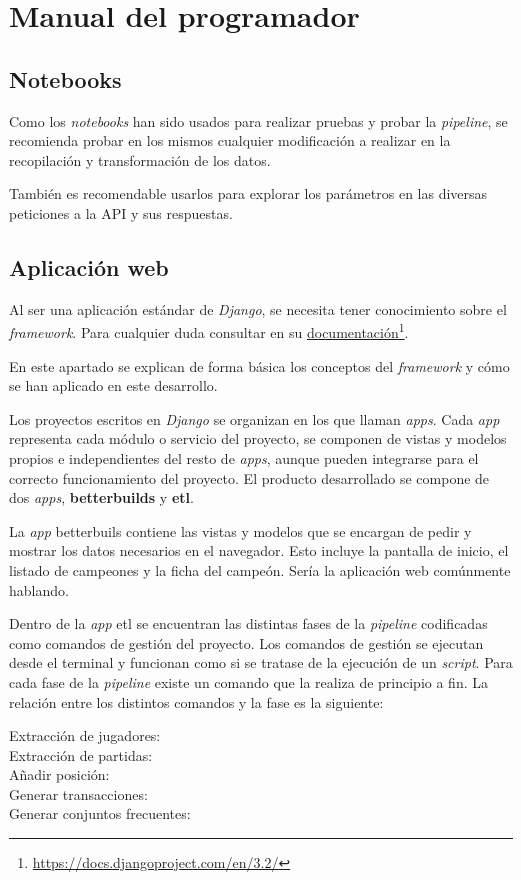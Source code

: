 \section{Manual del programador}
\subsection{Notebooks}
Como los \textit{notebooks} han sido usados para realizar pruebas y probar la \textit{pipeline}, se recomienda probar en los mismos cualquier modificación a realizar en la recopilación y transformación de los datos.

También es recomendable usarlos para explorar los parámetros en las diversas peticiones a la API y sus respuestas.

\subsection{Aplicación web}
Al ser una aplicación estándar de \textit{Django}, se necesita tener conocimiento sobre el \textit{framework}. Para cualquier duda consultar en su \href{https://docs.djangoproject.com/en/3.2/}{documentación}\footnote{\url{https://docs.djangoproject.com/en/3.2/}}.

En este apartado se explican de forma básica los conceptos del \textit{framework} y cómo se han aplicado en este desarrollo.

Los proyectos escritos en \textit{Django} se organizan en los que llaman \textit{apps}. Cada \textit{app} representa cada módulo o servicio del proyecto, se componen de vistas y modelos propios e independientes del resto de \textit{apps}, aunque pueden integrarse para el correcto funcionamiento del proyecto. El producto desarrollado se compone de dos \textit{apps}, \textbf{betterbuilds} y \textbf{etl}.

La \textit{app} betterbuils contiene las vistas y modelos que se encargan de pedir y mostrar los datos necesarios en el navegador. Esto incluye la pantalla de inicio, el listado de campeones y la ficha del campeón. Sería la aplicación web comúnmente hablando.

Dentro de la \textit{app} etl se encuentran las distintas fases de la \textit{pipeline} codificadas como comandos de gestión del proyecto. Los comandos de gestión se ejecutan desde el terminal y funcionan como si se tratase de la ejecución de un \textit{script}. Para cada fase de la \textit{pipeline} existe un comando que la realiza de principio a fin. La relación entre los distintos comandos y la fase es la siguiente:
\begin{description}
	\item[Extracción de jugadores:] 
	\item[Extracción de partidas:] 
	\item[Añadir posición:] 
	\item[Generar transacciones:] 
	\item[Generar conjuntos frecuentes:] 
\end{description}

